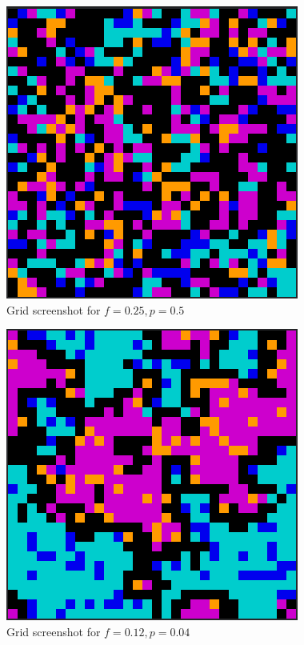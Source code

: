 \begin{enumerate}
\begin{figure}[h!]
\centering
\includegraphics[scale=1.0]{partb1scrot1.png}
\caption{Grid screenshot for $f = 0.25, p = 0.5$}
\label{scrot1}
\end{figure}

\begin{figure}[h!]
\centering
\includegraphics[scale=1.0]{partb2scrot1.png}
\caption{Grid screenshot for $f = 0.12, p = 0.04$}
\label{scrot2}
\end{figure}


\end{enumerate}
